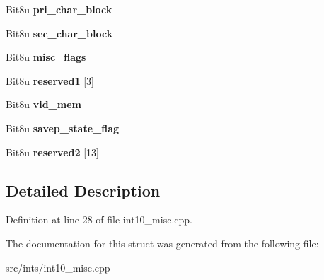 \begin{DoxyCompactItemize}
\item 
\hypertarget{structDynamic__Functionality_a1b8deb7bd07f706dc0d6321605cd1fa0}{Bit8u {\bfseries pri\-\_\-char\-\_\-block}}\label{structDynamic__Functionality_a1b8deb7bd07f706dc0d6321605cd1fa0}

\item 
\hypertarget{structDynamic__Functionality_a17d68d4c6c4a844b467ec2127c3872d6}{Bit8u {\bfseries sec\-\_\-char\-\_\-block}}\label{structDynamic__Functionality_a17d68d4c6c4a844b467ec2127c3872d6}

\item 
\hypertarget{structDynamic__Functionality_ac0fbd9caf24c6be49e9916974ec0db78}{Bit8u {\bfseries misc\-\_\-flags}}\label{structDynamic__Functionality_ac0fbd9caf24c6be49e9916974ec0db78}

\item 
\hypertarget{structDynamic__Functionality_a9944fcad0c67928d5a2cee2951bb6df0}{Bit8u {\bfseries reserved1} \mbox{[}3\mbox{]}}\label{structDynamic__Functionality_a9944fcad0c67928d5a2cee2951bb6df0}

\item 
\hypertarget{structDynamic__Functionality_a7845b1a37a5ac168e857681127555aab}{Bit8u {\bfseries vid\-\_\-mem}}\label{structDynamic__Functionality_a7845b1a37a5ac168e857681127555aab}

\item 
\hypertarget{structDynamic__Functionality_a5b2a1c1efbf2488edfe34a88a61d72b7}{Bit8u {\bfseries savep\-\_\-state\-\_\-flag}}\label{structDynamic__Functionality_a5b2a1c1efbf2488edfe34a88a61d72b7}

\item 
\hypertarget{structDynamic__Functionality_a5e4552894829ff9469a2fd2572f77774}{Bit8u {\bfseries reserved2} \mbox{[}13\mbox{]}}\label{structDynamic__Functionality_a5e4552894829ff9469a2fd2572f77774}

\end{DoxyCompactItemize}


\subsection{Detailed Description}


Definition at line 28 of file int10\-\_\-misc.\-cpp.



The documentation for this struct was generated from the following file\-:\begin{DoxyCompactItemize}
\item 
src/ints/int10\-\_\-misc.\-cpp\end{DoxyCompactItemize}
